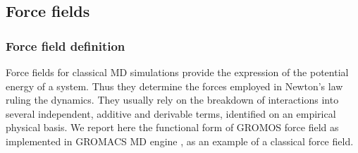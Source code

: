 \documentclass[graybox]{svmult}
\begin{document}
\subsection{Force fields} 

\subsubsection{Force field definition} \label{sec:ff}

Force fields for classical MD simulations provide the expression of the potential energy of
a system. Thus they determine the forces employed in Newton’s law ruling the dynamics.
They usually rely on the breakdown of interactions into several independent, additive and
derivable terms, identified on an empirical physical basis.
%
We report here the functional form of GROMOS force field \cite{Oostenbrink2004,Schmid2011} as implemented in GROMACS MD engine \cite{Berendsen1995,Abraham2015,gromacs_man}, as an example of a classical force field.
\end{document}
